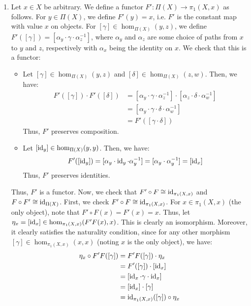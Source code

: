 \documentclass[12pt]{article}
\begin{document}
\begin{solution}
\begin{enumerate}
    \item  Let $x \in X$ be arbitrary. We define a functor $F': \Pi(X) \to \pi_1(X, x)$ as follows. For $y \in \Pi(X)$, we define $F'(y) = x$, i.e. $F'$ is the constant map with value $x$ on objects. For $[\gamma] \in \hom_{\Pi(X)}(y, z)$, we define $F'([\gamma]) = [\alpha_y \cdot \gamma \cdot \alpha_z^{-1}]$, where $\alpha_y$ and $\alpha_z$ are some choice of paths from $x$ to $y$ and $z$, respectively with $\alpha_x$ being the identity on $x$. We check that this is a functor: 
    \begin{itemize}
        \item Let $[\gamma] \in \hom_{\Pi(X)}(y, z)$ and $[\delta] \in \hom_{\Pi(X)}(z, w)$. Then, we have:
        \begin{align*}
            F'([\gamma]) \cdot F'([\delta]) &= [\alpha_y \cdot \gamma \cdot \alpha_z^{-1}] \cdot [\alpha_z \cdot \delta \cdot \alpha_w^{-1}] \\
            &= [\alpha_y \cdot \gamma \cdot \delta \cdot \alpha_w^{-1}] \\
            &= F'([\gamma \cdot \delta])
        \end{align*}
        Thus, $F'$ preserves composition.
        \item Let $[\operatorname{id}_y] \in \hom_{\Pi(X)}(y, y)$. Then, we have:
        \[ F'([\operatorname{id}_y]) = [\alpha_y \cdot \operatorname{id}_y \cdot \alpha_y^{-1}] = [\alpha_y \cdot \alpha_y^{-1}] = [\operatorname{id}_x]\]
        Thus, $F'$ preserves identities.
    \end{itemize}
    Thus, $F'$ is a functor. Now, we check that $F' \circ F \cong \operatorname{id}_{\pi_1(X, x)}$ and $F \circ F' \cong \operatorname{id}_{\Pi(X)}$. \bbni 
    First, we check $F' \circ F \cong \operatorname{id}_{\pi_1(X, x)}$. For $x \in \pi_1(X, x)$ (the only object), note that $F' \circ F(x) = F'(x) = x$. Thus, let $\eta_x = [\operatorname{id}_x] \in \hom_{\pi_1(X, x)}(F'F(x), x)$. This is clearly an isomorphism. Moreover, it clearly satisfies the naturality condition, since for any other morphism $[\gamma] \in \hom_{\pi_1(X, x)}(x, x)$ (noting $x$ is the only object), we have:
    \begin{align*}
        \eta_x \circ F'F([\gamma]) &= F'F([\gamma]) \cdot \eta_x\\
        &= F'([\gamma]) \cdot [\operatorname{id}_x] \\
        &= [\operatorname{id}_x \cdot \gamma \cdot \operatorname{id}_x] \\
        &= [\operatorname{id}_x] \cdot [\gamma] \\
        &= \operatorname{id}_{\pi_1(X, x)}([\gamma]) \circ \eta_x
    \end{align*}

\end{enumerate}
\end{solution}
\end{document}
